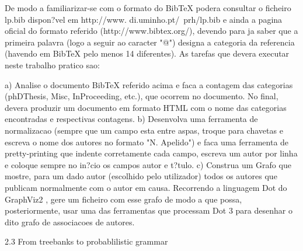 De modo a familiarizar-se com o formato do BibTeX podera consultar o ficheiro lp.bib dispon?vel em http://www.
di.uminho.pt/~prh/lp.bib e ainda a pagina oficial do formato referido (http://www.bibtex.org/), devendo para
ja saber que a primeira palavra (logo a seguir ao caracter "@") designa a categoria da referencia (havendo em BibTeX
pelo menos 14 diferentes).
As tarefas que devera executar neste trabalho pratico sao:

a) Analise o documento BibTeX referido acima e faca a contagem das categorias (phDThesis, Misc, InProceeding,
    etc.), que ocorrem no documento. No final, devera produzir um documento em formato HTML com o nome das
    categorias encontradas e respectivas contagens.
b) Desenvolva uma ferramenta de normalizacao (sempre que um campo esta entre aspas, troque para chavetas e
    escreva o nome dos autores no formato "N. Apelido") e faca uma ferramenta de pretty-printing que indente
    corretamente cada campo, escreva um autor por linha e coloque sempre no in?cio os campos autor e t?tulo.
c) Construa um Grafo que mostre, para um dado autor (escolhido pelo utilizador) todos os autores que publicam
     normalmente com o autor em causa.
     Recorrendo a linguagem Dot do GraphViz2 , gere um ficheiro com esse grafo de modo a que possa, posteriormente,
     usar uma das ferramentas que processam Dot 3 para desenhar o dito grafo de associacoes de autores.

2.3    From treebanks to probablilistic grammar
